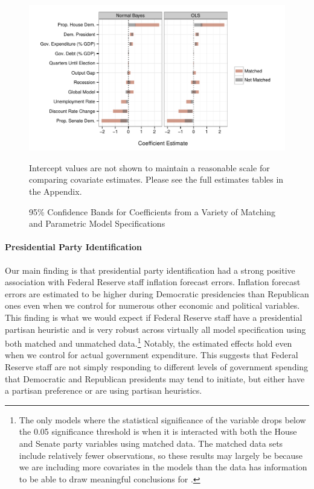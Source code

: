 \documentclass[a4paper]{article}\usepackage{graphicx, color}
\newenvironment{knitrout}{}{} %
\begin{document}
\begin{figure}[t]
    \caption{95\% Confidence Bands for Coefficients from a Variety of Matching and Parametric Model Specifications}
    \label{CoefComparePlots}
    \begin{center}

\begin{knitrout}
\color{fgcolor}\includegraphics[width=0.95\linewidth]{figure/CoefComparePlots} 
\end{knitrout}

    \end{center}
    \begin{singlespace}
        {\scriptsize{Intercept values are not shown to maintain a reasonable scale for comparing covariate estimates. Please see the full estimates tables in the Appendix.}}
    \end{singlespace}
\end{figure}

\paragraph{Presidential Party Identification}

Our main finding is that presidential party identification had a strong positive association with Federal Reserve staff inflation forecast errors. Inflation forecast errors are estimated to be higher during Democratic presidencies than Republican ones even when we control for numerous other economic and political variables. This finding is what we would expect if Federal Reserve staff have a presidential partisan heuristic and is very robust across virtually all model specification using both matched and unmatched data.\footnote{The only models where the statistical significance of the variable drops below the 0.05 significance threshold is when it is interacted with both the House and Senate party variables using matched data. The matched data sets include relatively fewer observations, so these results may largely be because we are including more covariates in the models than the data has information to be able to draw meaningful conclusions for \citep{Brambor2006}.} Notably, the estimated effects hold even when we control for actual government expenditure. This suggests that Federal Reserve staff are not simply responding to different levels of government spending that Democratic and Republican presidents may tend to initiate, but either have a partisan preference or are using partisan heuristics.
\end{document}
